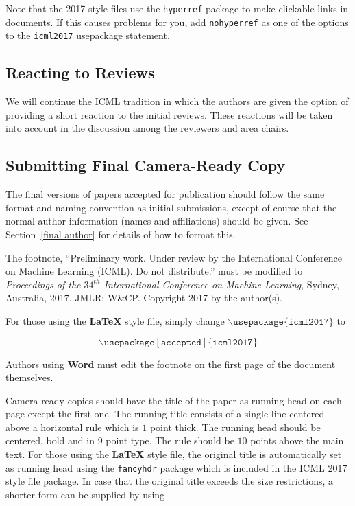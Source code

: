 \documentclass{article}
\begin{document}
Note that the 2017 style files use the {\tt hyperref} package to
make clickable links in documents.  If this causes problems for you,
add {\tt nohyperref} as one of the options to the {\tt icml2017}
usepackage statement.

\subsection{Reacting to Reviews}

We will continue the ICML tradition in which the authors are given the
option of providing a short reaction to the initial reviews. These
reactions will be taken into account in the discussion among the
reviewers and area chairs.

\subsection{Submitting Final Camera-Ready Copy}

The final versions of papers accepted for publication should follow the
same format and naming convention as initial submissions, except of
course that the normal author information (names and affiliations)
should be given.  See Section~\ref{final author} for details of how to
format this.

The footnote, ``Preliminary work.  Under review by the International
Conference on Machine Learning (ICML).  Do not distribute.'' must be
modified to \textit{Proceedings of the
$\mathit{34}^{th}$ International Conference on Machine Learning},
Sydney, Australia, 2017.  JMLR: W\&CP. 
Copyright 2017 by the author(s).

For those using the \textbf{\LaTeX} style file, simply change
$\mathtt{\backslash usepackage\{icml2017\}}$ to 

$$\mathtt{\backslash usepackage[accepted]\{icml2017\}}$$

\noindent
Authors using \textbf{Word} must edit the
footnote on the first page of the document themselves.

Camera-ready copies should have the title of the paper as running head
on each page except the first one.  The running title consists of a
single line centered above a horizontal rule which is $1$ point thick.
The running head should be centered, bold and in $9$ point type.  The
rule should be $10$ points above the main text.  For those using the
\textbf{\LaTeX} style file, the original title is automatically set as running
head using the {\tt fancyhdr} package which is included in the ICML
2017 style file package.  In case that the original title exceeds the
size restrictions, a shorter form can be supplied by using
\end{document}
